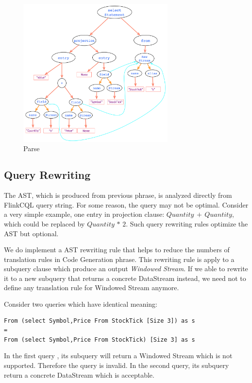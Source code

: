 \begin{figure}[h!] 
\centering    
\includegraphics[width=0.7\textwidth]{Parse}
\caption{Parse}
\label{fig:Parse}
\end{figure}


\subsection{Query Rewriting}
The AST, which is produced from previous phrase, is analyzed directly from FlinkCQL query string. For some reason, the query may not be optimal. Consider a very simple example, one entry in projection clause: $Quantity\, +\, Quantity$, which could be replaced by $Quantity\, *\, 2$. Such query rewriting rules optimize the AST but optional. 

We  do implement a AST rewriting rule that helps to reduce the numbers of translation rules in Code Generation phrase. This rewriting rule is apply to a subquery clause which produce an output \textit{Windowed Stream}. If we able to rewrite it to a new subquery that returns a concrete DataStream instead, we need not to define any translation rule for Windowed Stream anymore.

Consider two queries which have identical meaning:

\begin{lstlisting}
From (select Symbol,Price From StockTick [Size 3]) as s
=
From (select Symbol,Price From StockTick) [Size 3] as s
\end{lstlisting}

In the first query , its subquery will return a Windowed Stream which is not supported. Therefore the query is invalid. In the second query, its subquery return a concrete DataStream which is acceptable.

